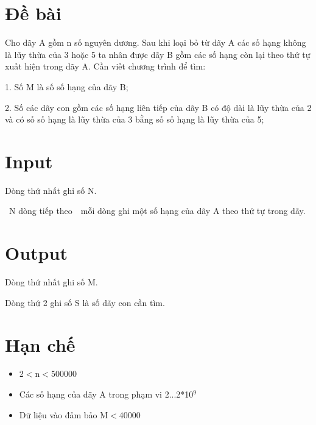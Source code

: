 

\section{\textbf{Đề bài}}

Cho dãy A gồm n số nguyên dương. Sau khi loại bỏ từ dãy A các số hạng không là lũy thừa của 3 hoặc 5 ta nhân được dãy B gồm các số hạng còn lại theo thứ tự xuất hiện trong dãy A. Cần viết chương trình để tìm:

1. Số M là số số hạng của dãy B;

2. Số các dãy con gồm các số hạng liên tiếp của dãy B có độ dài là lũy thừa của 2 và có số số hạng là lũy thừa của 3 bằng số số hạng là lũy thừa của 5;

\section{\textbf{Input}}

Dòng thứ nhất ghi số N.

 N dòng tiếp theo  mỗi dòng ghi một số hạng của dãy A theo thứ tự trong dãy.

\section{\textbf{Output}}

Dòng thứ nhất ghi số M.

Dòng thứ 2 ghi số S là số dãy con cần tìm.

\section{\textbf{Hạn chế}}
\begin{itemize}
	\item 2$<$n$<$500000
\end{itemize}
\begin{itemize}
	\item Các số hạng của dãy A trong phạm vi 2...2*10$^9$
\end{itemize}
\begin{itemize}
	\item Dữ liệu vào đảm bảo M$<$40000
\end{itemize}


